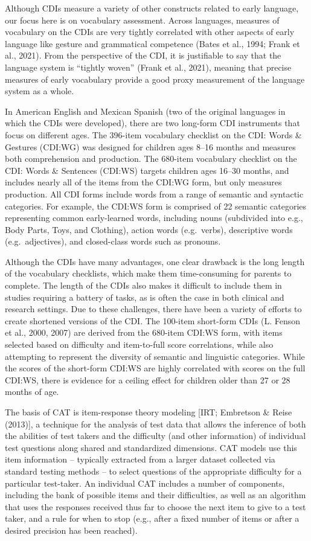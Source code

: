 \documentclass[10pt, letterpaper]{article}
\begin{document}
Although CDIs measure a variety of other constructs related to early
language, our focus here is on vocabulary assessment. Across languages,
measures of vocabulary on the CDIs are very tightly correlated with
other aspects of early language like gesture and grammatical competence
(Bates et al., 1994; Frank et al., 2021). From the perspective of the
CDI, it is justifiable to say that the language system is ``tightly
woven'' (Frank et al., 2021), meaning that precise measures of early
vocabulary provide a good proxy measurement of the language system as a
whole.

In American English and Mexican Spanish (two of the original languages
in which the CDIs were developed), there are two long-form CDI
instruments that focus on different ages. The 396-item vocabulary
checklist on the CDI: Words \& Gestures (CDI:WG) was designed for
children ages 8--16 months and measures both comprehension and
production. The 680-item vocabulary checklist on the CDI: Words \&
Sentences (CDI:WS) targets children ages 16--30 months, and includes
nearly all of the items from the CDI:WG form, but only measures
production. All CDI forms include words from a range of semantic and
syntactic categories. For example, the CDI:WS form is comprised of 22
semantic categories representing common early-learned words, including
nouns (subdivided into e.g., Body Parts, Toys, and Clothing), action
words (e.g.~verbs), descriptive words (e.g.~adjectives), and
closed-class words such as pronouns.

Although the CDIs have many advantages, one clear drawback is the long
length of the vocabulary checklists, which make them time-consuming for
parents to complete. The length of the CDIs also makes it difficult to
include them in studies requiring a battery of tasks, as is often the
case in both clinical and research settings. Due to these challenges,
there have been a variety of efforts to create shortened versions of the
CDI. The 100-item short-form CDIs (L. Fenson et al., 2000, 2007) are
derived from the 680-item CDI:WS form, with items selected based on
difficulty and item-to-full score correlations, while also attempting to
represent the diversity of semantic and linguistic categories. While the
scores of the short-form CDI:WS are highly correlated with scores on the
full CDI:WS, there is evidence for a ceiling effect for children older
than 27 or 28 months of age.

The basis of CAT is item-response theory modeling {[}IRT; Embretson \&
Reise (2013){]}, a technique for the analysis of test data that allows
the inference of both the abilities of test takers and the difficulty
(and other information) of individual test questions along shared and
standardized dimensions. CAT models use this item information --
typically extracted from a larger dataset collected via standard testing
methods -- to select questions of the appropriate difficulty for a
particular test-taker. An individual CAT includes a number of
components, including the bank of possible items and their difficulties,
as well as an algorithm that uses the responses received thus far to
choose the next item to give to a test taker, and a rule for when to
stop (e.g., after a fixed number of items or after a desired precision
has been reached).
\end{document}
